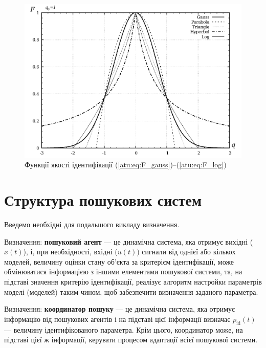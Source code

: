 \begin{figure}[htb!]
  \begin{center}
    \includegraphics[width=45\TW]{p/F_types.png}
  \end{center}
  \caption{Функції якості ідентифікації (\ref{atu:eq:F_gauss})--(\ref{atu:eq:F_log})}
  \label{atu:f:F_types}
\end{figure}




\section{Структура пошукових систем} %


Введемо необхідні для подальшого викладу визначення.

Визначення:
\textbf{пошуковий агент} --- це динамічна система, яка отримує вихідні ($x(t)$),
і, при необхідності, вхідні ($u(t)$) сигнали від однієї або кількох моделей,
величину оцінки стану об'єкта за критерієм ідентифікації,
може обмінюватися інформацією з іншими елементами пошукової системи,
та, на підставі значення критерію
ідентифікації, реалізує алгоритм настройки параметрів моделі (моделей) таким
чином, щоб забезпечити визначення заданого параметра.

Визначення:
\textbf{координатор пошуку} --- це динамічна система, яка отримує інформацію
від пошукових агентів і на підставі цієї інформації визначає
$p_{\mathrm{id}}(t)$ --- величину ідентифікованого параметра.
Крім цього, координатор може, на підставі цієї ж інформації,
керувати процесом адаптації всієї пошукової системи.


